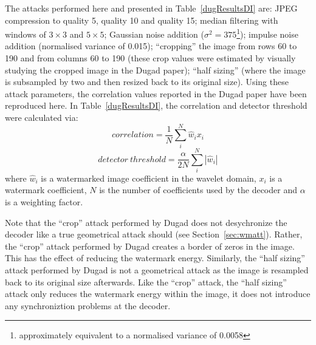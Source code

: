 \documentclass[12pt]{report}
\begin{document}
The attacks performed here and presented in Table~\ref{dugResultsDI} are: 
JPEG compression to quality 5, quality 10 and quality 15; median filtering 
with windows of $3\times3$ and $5\times5$; Gaussian noise addition 
($\sigma^{2}=375$\footnote{approximately equivalent to a normalised variance of 0.0058}); 
impulse noise addition
(normalised variance of 0.015); ``cropping'' the image from rows 60 to 190 and from columns 60 to 190
(these crop values were estimated by visually studying the cropped image in the Dugad paper);
``half sizing'' 
(where the image is subsampled by two and then resized back to its original size).
Using these attack parameters, the correlation values reported in the Dugad paper have been 
reproduced here. 
In Table~\ref{dugResultsDI}, the correlation and detector threshold were calculated via:
\begin{equation}
	correlation=\frac{1}{N} \sum^{N}_{i} \hat{w}_{i}x_{i}
\end{equation}
\begin{equation}
detector~threshold = \frac{\alpha}{2N} \sum^{N}_{i} |\hat{w}_{i}|
\end{equation}
where $\hat{w}_{i}$ is a watermarked image coefficient in the wavelet domain, $x_{i}$ is a watermark 
coefficient, $N$ is the number of coefficients used by the decoder and $\alpha$ is a weighting factor.

Note that the ``crop'' attack performed by Dugad does not desychronize the decoder
like a true geometrical attack should (see Section~\ref{sec:wmatt}).
Rather, the ``crop'' attack performed by Dugad creates 
a border of zeros in the image. This has the effect of reducing the watermark energy. Similarly,
the ``half sizing'' attack performed by Dugad is not a geometrical attack as the image is resampled back to its
original size afterwards. Like the ``crop'' attack, 
the ``half sizing'' attack only reduces the watermark energy within
the image, it does not introduce any synchroniztion problems at the decoder. 
\end{document}
